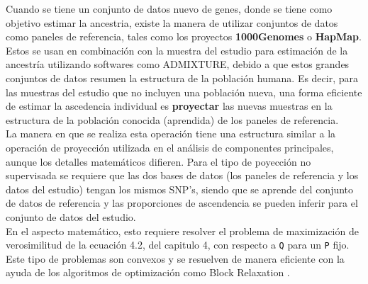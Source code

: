 Cuando se tiene un conjunto de datos nuevo de genes, donde se tiene como
objetivo estimar la ancestria, existe la manera de utilizar conjuntos
de datos como paneles de referencia, tales como los proyectos
\textbf{1000Genomes} o \textbf{HapMap}. Estos se usan en combinaci\'on con la
muestra del estudio para estimación de la ancestr\'ia utilizando softwares como ADMIXTURE, debido a que estos grandes conjuntos de
datos resumen la estructura de la poblaci\'on humana. Es decir, para
las muestras del estudio que no incluyen una poblaci\'on nueva, una
forma eficiente de estimar la ascedencia individual es
\textbf{proyectar} las nuevas muestras en la estructura de la poblaci\'on conocida (aprendida) de los paneles de referencia.\\

La manera en que se realiza esta operaci\'on tiene una estructura similar a la operaci\'on de proyecci\'on utilizada en el an\'alisis de componentes principales, aunque los detalles matem\'aticos difieren. Para el tipo de poyecci\'on no supervisada se requiere que las dos bases de datos (los paneles de referencia y los datos del estudio) tengan los mismos SNP's, siendo que se aprende del conjunto de datos de referencia y las proporciones de ascendencia se pueden inferir para el conjunto de datos del estudio.\\

En el aspecto matem\'atico, esto requiere resolver el problema de maximizaci\'on de verosimilitud de la ecuaci\'on 4.2, del capitulo 4, con respecto a \texttt{Q} para un \texttt{P} fijo. Este tipo de problemas son convexos y se resuelven de manera eficiente con la ayuda de los algoritmos de optimizaci\'on como Block Relaxation \cite{Suyash}.





